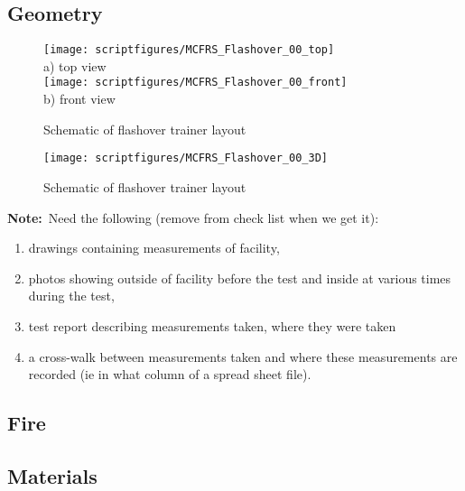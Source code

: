\documentclass[11pt]{book}
\newcommand{\note}{{\bf Note:}}
\begin{document}
\subsection{Geometry}
\begin{figure}[\figoptions]
\begin{center}
\texttt{[image: scriptfigures/MCFRS\_Flashover\_00\_top]}\\
a) top view\\
\texttt{[image: scriptfigures/MCFRS\_Flashover\_00\_front]}\\
b) front view\\
\end{center}
\caption {Schematic of flashover trainer layout}
\label{figflashoverplan}%
\end{figure}

\begin{figure}[\figoptions]
\begin{center}
\texttt{[image: scriptfigures/MCFRS\_Flashover\_00\_3D]}\\
\end{center}
\caption {Schematic of flashover trainer layout}
\label{figflashoverplan}%
\end{figure}

\note\ Need the following (remove from check list when we get it):
\begin{enumerate}
\item drawings containing measurements of facility,
\item photos showing outside of facility before the test and inside at various times during the test,
\item test report describing
measurements taken, where they were taken
\item a cross-walk between measurements taken and where these measurements are recorded (ie
in what column of a spread sheet file).
\end{enumerate}

\subsection{Fire}

\subsection{Materials}
\end{document}
